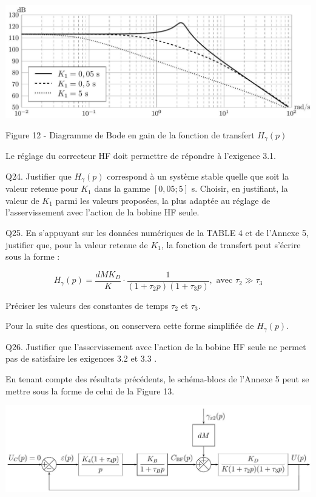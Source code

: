 \documentclass[10pt]{article}
\begin{document}
\begin{center}
\includegraphics[max width=\textwidth]{2024_04_26_3285cfc264024262add0g-13}
\end{center}

Figure 12 - Diagramme de Bode en gain de la fonction de transfert $H_{\gamma}(p)$

Le réglage du correcteur HF doit permettre de répondre à l'exigence 3.1.

Q24. Justifier que $H_{\gamma}(p)$ correspond à un système stable quelle que soit la valeur retenue pour $K_{1}$ dans la gamme $[0,05 ; 5]$ s. Choisir, en justifiant, la valeur de $K_{1}$ parmi les valeurs proposées, la plus adaptée au réglage de l'asservissement avec l'action de la bobine HF seule.

Q25. En s'appuyant sur les données numériques de la TABLE 4 et de l'Annexe 5, justifier que, pour la valeur retenue de $K_{1}$, la fonction de transfert peut s'écrire sous la forme :

$$
H_{\gamma}(p)=\frac{d M K_{D}}{K} \cdot \frac{1}{\left(1+\tau_{2} p\right)\left(1+\tau_{3} p\right)}, \text { avec } \tau_{2} \gg \tau_{3}
$$

Préciser les valeurs des constantes de temps $\tau_{2}$ et $\tau_{3}$.

Pour la suite des questions, on conservera cette forme simplifiée de $H_{\gamma}(p)$.

Q26. Justifier que l'asservissement avec l'action de la bobine HF seule ne permet pas de satisfaire les exigences 3.2 et 3.3 .

En tenant compte des résultats précédents, le schéma-blocs de l'Annexe 5 peut se mettre sous la forme de celui de la Figure 13.

\begin{center}
\includegraphics[max width=\textwidth]{2024_04_26_3285cfc264024262add0g-14}
\end{center}
\end{document}

